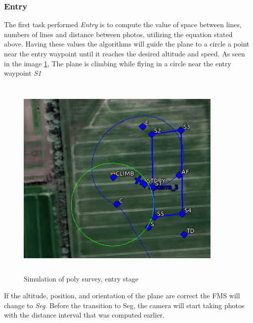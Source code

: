 \subsubsection{Entry}
The first task performed \textit{Entry} is to compute the value of space between lines, numbers of lines and distance between photos, utilizing the equation stated above. Having these values the algorithms will guide the plane to a circle a point near the entry waypoint until it reaches the desired altitude and speed. As seen in the image \ref{fig:entry_stage}, The plane is climbing while flying in a circle near the entry waypoint \textit{S1}
\begin{figure}[H]
\centering
\includegraphics[width=10cm,height=10cm,keepaspectratio]{imagenes/Entry.png}
\caption{Simulation of poly survey, entry stage}
\label{fig:entry_stage}
\end{figure}
If the altitude, position, and orientation of the plane are correct the FMS will change to \textit{Seg}. Before the transition to Seg, the camera will start taking photos with the distance interval that was computed earlier.
